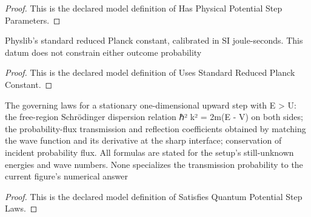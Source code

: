 \begin{proof}
  This is the declared model definition of Has Physical Potential Step Parameters.
\end{proof}
\begin{definition}
  \label{def:physics:phyx-mini-0534:phyxminiproblems-problemphyxmini0534-usesstandardreducedplanckconstant}
  Physlib's standard reduced Planck constant, calibrated in SI joule-seconds. This datum does not constrain either outcome probability
\end{definition}
\begin{proof}
  This is the declared model definition of Uses Standard Reduced Planck Constant.
\end{proof}
\begin{definition}
  \label{def:physics:phyx-mini-0534:phyxminiproblems-problemphyxmini0534-satisfiesquantumpotentialsteplaws}
  The governing laws for a stationary one-dimensional upward step with E > U: the free-region Schrödinger dispersion relation ℏ² k² = 2m(E - V) on both sides; the probability-flux transmission and reflection coefficients obtained by matching the wave function and its derivative at the sharp interface; conservation of incident probability flux. All formulas are stated for the setup's still-unknown energies and wave numbers. None specializes the transmission probability to the current figure's numerical answer
\end{definition}
\begin{proof}
  This is the declared model definition of Satisfies Quantum Potential Step Laws.
\end{proof}
